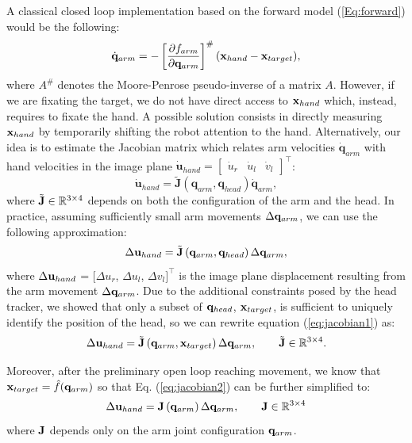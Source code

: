 A classical closed loop implementation based on the forward model 
(\ref{Eq:forward}) would be the following:
$$ \dot {\mathbf q}_{arm} = -\left[ \frac{\partial f_{arm}}{\partial \mathbf q_{arm}} \right]^\# (\mathbf{x}_{hand} - \mathbf{x}_{target}),$$
where $A^\#$ denotes the Moore-Penrose pseudo-inverse of a matrix $A$. However,
if we are fixating the target, we do not have direct access to $\mathbf{x}_{hand}$
which, instead, requires to fixate the hand. A possible solution consists in 
directly measuring $\mathbf{x}_{hand}$ by temporarily shifting the robot attention to the hand.
Alternatively, our idea is to estimate the Jacobian matrix which relates arm velocities $\dot {\mathbf q}_{arm}$
with hand velocities in the image plane $\dot {\mathbf u}_{hand} = \left[ 
\begin{array}{ccc}
  \dot u_r & \dot u_l & \dot v_{l}
\end{array} \right]^\top$:
\begin{equation} 
  \dot {\mathbf u}_{hand}=
  \tilde{\mathbf J}\left(\mathbf q_{arm}, \mathbf q_{head}\right)
  \dot {\mathbf q}_{arm},
\end{equation}
where $\tilde{\mathbf J} \in \mathbb R^{3 \times 4}$ depends on 
both the configuration of the arm and the head. In practice, assuming 
sufficiently small arm movements $\Delta \mathbf {q}_{arm}$, we can use the following 
approximation:
%
\begin{equation} 
\label{eq:jacobian1}
  \Delta \mathbf {u}_{hand}=
  \tilde{\mathbf J}\left(\mathbf q_{arm}, \mathbf q_{head}\right)
  \Delta \mathbf {q}_{arm},
\end{equation}
where $\Delta \mathbf {u}_{hand}$ = $[ \Delta u_r$, $\Delta u_l$, $\Delta v_{l}]^\top$
is the image plane displacement resulting from the arm movement $\Delta \mathbf {q}_{arm}$. 
Due to the additional constraints posed by the head tracker, we showed
that only a subset of $\mathbf{q}_{head}$, $\mathbf{x}_{target}$, is 
sufficient to uniquely identify the position of the head, so we 
can rewrite equation (\ref{eq:jacobian1}) as:
%
\begin{equation}
\label{eq:jacobian2}
  \Delta \mathbf {u}_{hand}=
  \tilde{\mathbf J}\left(\mathbf q_{arm}, \mathbf{x}_{target}\right)
  \Delta \mathbf {q}_{arm}, \qquad \tilde{\mathbf J} \in \mathbb R^{3 \times 4}.
\end{equation}
%

Moreover, after the preliminary open loop reaching movement, we know
that $\mathbf{x}_{target} = \hat f(\mathbf q_{arm})$ so that  Eq.
(\ref{eq:jacobian2}) can be further simplified to:
%
\begin{equation} 
\label{eq:jacobian3}
  \Delta \mathbf {u}_{hand}=
  \mathbf J \left(\mathbf q_{arm}\right)
  \Delta \mathbf {q}_{arm},\qquad \mathbf J \in \mathbb R^{3\times4}
\end{equation}
%
where $\mathbf J$ depends only on the arm joint configuration $\mathbf q_{arm}$.

